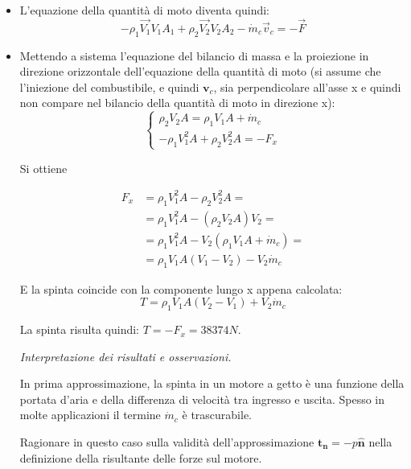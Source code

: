 \begin{itemize}
  \item L'equazione della quantità di moto diventa quindi:
  \begin{equation}
  - \rho_1 \vec{V_1} V_1 A_1 + \rho_2 \vec{V_2} V_2 A_2 - \dot{m}_c \vec{v}_c = - \vec{F}
  \end{equation}
  \item Mettendo a sistema l'equazione del bilancio di massa e la proiezione in direzione orizzontale dell'equazione della quantità di moto (si assume che l'iniezione del combustibile, e quindi $\bm{v}_c$, sia perpendicolare all'asse x e quindi non compare nel bilancio della quantità di moto in direzione x):
  \begin{equation}
  \begin{cases}
    \rho_2 V_2 A = \rho_1 V_1 A + \dot{m}_c \\
    -\rho_1 V_1^2 A + \rho_2 V_2^2 A = -F_x 
  \end{cases}
  \end{equation}
  
  Si ottiene
  
  \begin{equation}
  \begin{aligned}
    F_x & = \rho_1 V_1^2 A - \rho_2 V_2^2 A = \\
        & = \rho_1 V_1^2 A - (\rho_2 V_2 A) V_2 = \\
        & = \rho_1 V_1^2 A - V_2 (\rho_1 V_1 A + \dot{m}_c) = \\
        & = \rho_1 V_1 A (V_1 - V_2) - V_2 \dot{m}_c
  \end{aligned}
  \end{equation}

  E la spinta coincide con la componente lungo x appena calcolata:
  \begin{equation}
    T = \rho_1 V_1 A (V_2 - V_1) + V_2 \dot{m}_c
  \end{equation}
  
  La spinta risulta quindi: $T = -F_x = 38374N$.
  
  \vspace{0.3cm}
  \textit{Interpretazione dei risultati e osservazioni.} 

In prima approssimazione, la spinta in un motore a getto è una funzione della portata d'aria e della differenza di velocità tra ingresso e uscita. Spesso in molte applicazioni il termine $\dot{m}_c$ è trascurabile.

Ragionare in questo caso sulla validità dell'approssimazione $\bm{t_n} = -p\bm{\hat{n}}$ nella 
definizione della risultante delle forze sul motore.


  
\end{itemize}
